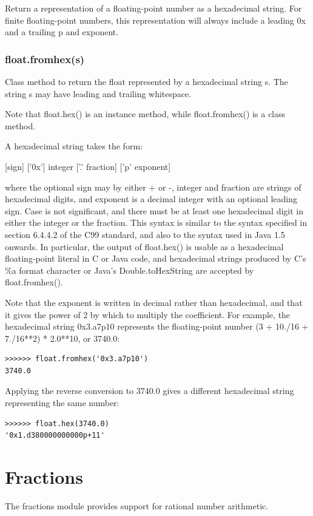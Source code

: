 Return a representation of a floating-point number as a hexadecimal string. For finite floating-point numbers, this representation will always include a leading 0x and a trailing p and exponent.

\subsubsection{float.fromhex(s)}

Class method to return the float represented by a hexadecimal string s. The string s may have leading and trailing whitespace.

\vpara
Note that float.hex() is an instance method, while float.fromhex() is a class method.

A hexadecimal string takes the form:

[sign] ['0x'] integer ['.' fraction] ['p' exponent]

where the optional sign may by either + or -, integer and fraction are strings of hexadecimal digits, and exponent is a decimal integer with an optional leading sign. Case is not significant, and there must be at least one hexadecimal digit in either the integer or the fraction. This syntax is similar to the syntax specified in section 6.4.4.2 of the C99 standard, and also to the syntax used in Java 1.5 onwards. In particular, the output of float.hex() is usable as a hexadecimal floating-point literal in C or Java code, and hexadecimal strings produced by C's \%a format character or Java's Double.toHexString are accepted by float.fromhex().

\vpara
Note that the exponent is written in decimal rather than hexadecimal, and that it gives the power of 2 by which to multiply the coefficient. For example, the hexadecimal string 0x3.a7p10 represents the floating-point number (3 + 10./16 + 7./16**2) * 2.0**10, or 3740.0:

\begin{lstlisting}
>>>>>> float.fromhex('0x3.a7p10')
3740.0
\end{lstlisting}

Applying the reverse conversion to 3740.0 gives a different hexadecimal string representing the same number:

\begin{lstlisting}
>>>>>> float.hex(3740.0)
'0x1.d380000000000p+11'
\end{lstlisting}


\newpage
\section{Fractions}
The fractions module provides support for rational number arithmetic.

